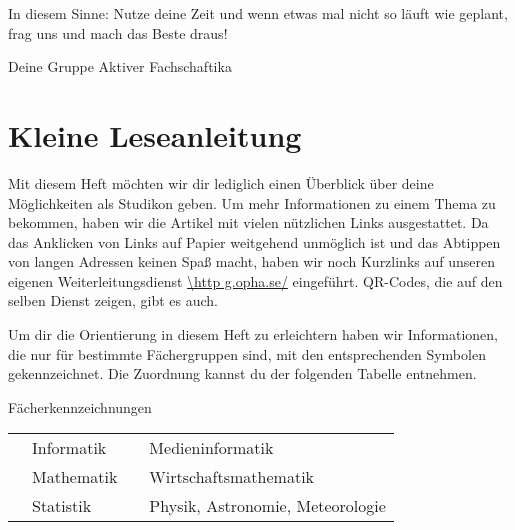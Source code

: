 In diesem Sinne: Nutze deine Zeit und wenn etwas mal nicht so läuft wie geplant, frag uns und mach das Beste draus!

Deine Gruppe Aktiver Fachschaftika

\chapter{Kleine Leseanleitung}

Mit diesem Heft möchten wir dir lediglich einen Überblick über deine Möglichkeiten als Studikon geben. Um mehr Informationen zu einem Thema zu bekommen, haben wir die Artikel mit vielen nützlichen Links ausgestattet. Da das Anklicken von Links auf Papier weitgehend unmöglich ist und das Abtippen von langen Adressen keinen Spaß macht, haben wir noch Kurzlinks auf unseren eigenen Weiterleitungsdienst \mbox{\url{\http g.opha.se/}} eingeführt. QR-Codes, die auf den selben Dienst zeigen, gibt es auch.

Um dir die Orientierung in diesem Heft zu erleichtern haben wir Informationen, die nur für bestimmte Fächergruppen sind, mit den entsprechenden Symbolen gekennzeichnet. Die Zuordnung kannst du der folgenden Tabelle entnehmen.

\begin{table*}[h]
	\centering
	Fächerkennzeichnungen
	\begin{tabular}{ l l l l }
		\subjectI & Informatik  & \subjectMI & Medieninformatik \\[1.5mm]
		\subjectM & Mathematik   & \subjectW  & Wirtschaftsmathematik \\[1.5mm]
		\subjectS & Statistik    & \subjectP  & Physik, Astronomie, Meteorologie
	\end{tabular}
\end{table*}
